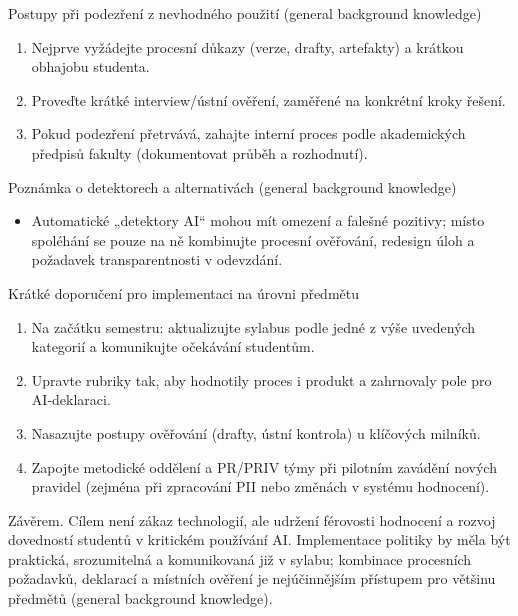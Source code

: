 Postupy při podezření z nevhodného použití (general background knowledge)
\begin{enumerate}
  \item Nejprve vyžádejte procesní důkazy (verze, drafty, artefakty) a krátkou obhajobu studenta.
  \item Proveďte krátké interview/ústní ověření, zaměřené na konkrétní kroky řešení.
  \item Pokud podezření přetrvává, zahajte interní proces podle akademických předpisů fakulty (dokumentovat průběh a rozhodnutí).
\end{enumerate}

Poznámka o detektorech a alternativách (general background knowledge)
\begin{itemize}
  \item Automatické „detektory AI“ mohou mít omezení a falešné pozitivy; místo spoléhání se pouze na ně kombinujte procesní ověřování, redesign úloh a požadavek transparentnosti v odevzdání.
\end{itemize}

Krátké doporučení pro implementaci na úrovni předmětu
\begin{enumerate}
  \item Na začátku semestru: aktualizujte sylabus podle jedné z výše uvedených kategorií a komunikujte očekávání studentům.
  \item Upravte rubriky tak, aby hodnotily proces i produkt a zahrnovaly pole pro AI‑deklaraci.
  \item Nasazujte postupy ověřování (drafty, ústní kontrola) u klíčových milníků.
  \item Zapojte metodické oddělení a PR/PRIV týmy při pilotním zavádění nových pravidel (zejména při zpracování PII nebo změnách v systému hodnocení).
\end{enumerate}

Závěrem. Cílem není zákaz technologií, ale udržení férovosti hodnocení a rozvoj dovedností studentů v kritickém používání AI. Implementace politiky by měla být praktická, srozumitelná a komunikovaná již v sylabu; kombinace procesních požadavků, deklarací a místních ověření je nejúčinnějším přístupem pro většinu předmětů (general background knowledge).